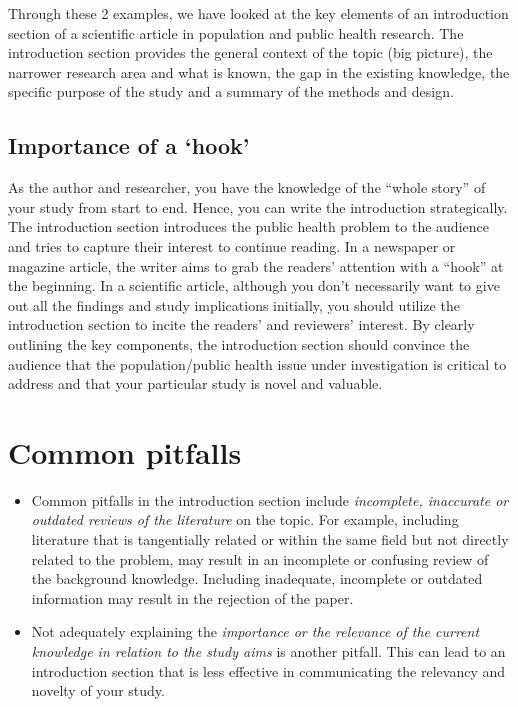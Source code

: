 \documentclass[
]{book}
\providecommand{\tightlist}{%
  \setlength{\itemsep}{0pt}\setlength{\parskip}{0pt}}
\begin{document}
Through these 2 examples, we have looked at the key elements of an introduction section of a scientific article in population and public health research. The introduction section provides the general context of the topic (big picture), the narrower research area and what is known, the gap in the existing knowledge, the specific purpose of the study and a summary of the methods and design.

\hypertarget{importance-of-a-hook}{%
\subsection{Importance of a `hook'}\label{importance-of-a-hook}}

As the author and researcher, you have the knowledge of the ``whole story'' of your study from start to end. Hence, you can write the introduction strategically. The introduction section introduces the public health problem to the audience and tries to capture their interest to continue reading. In a newspaper or magazine article, the writer aims to grab the readers' attention with a ``hook'' at the beginning. In a scientific article, although you don't necessarily want to give out all the findings and study implications initially, you should utilize the introduction section to incite the readers' and reviewers' interest. By clearly outlining the key components, the introduction section should convince the audience that the population/public health issue under investigation is critical to address and that your particular study is novel and valuable.

\hypertarget{common-pitfalls}{%
\section{Common pitfalls}\label{common-pitfalls}}

\begin{itemize}
\tightlist
\item
  Common pitfalls in the introduction section include \emph{incomplete, inaccurate or outdated reviews of the literature} on the topic. For example, including literature that is tangentially related or within the same field but not directly related to the problem, may result in an incomplete or confusing review of the background knowledge. Including inadequate, incomplete or outdated information may result in the rejection of the paper.
\item
  Not adequately explaining the \emph{importance or the relevance of the current knowledge in relation to the study aims} is another pitfall. This can lead to an introduction section that is less effective in communicating the relevancy and novelty of your study.
\end{itemize}
\end{document}
